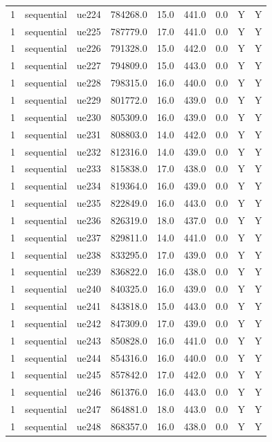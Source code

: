\begin{table}[ht]
\begin{tabular}{|c|c|c|c|c|c|c|c|c|}
1 & sequential & ue224 & 784268.0 & 15.0 & 441.0 & 0.0 & Y & Y \\
1 & sequential & ue225 & 787779.0 & 17.0 & 441.0 & 0.0 & Y & Y \\
1 & sequential & ue226 & 791328.0 & 15.0 & 442.0 & 0.0 & Y & Y \\
1 & sequential & ue227 & 794809.0 & 15.0 & 443.0 & 0.0 & Y & Y \\
1 & sequential & ue228 & 798315.0 & 16.0 & 440.0 & 0.0 & Y & Y \\
1 & sequential & ue229 & 801772.0 & 16.0 & 439.0 & 0.0 & Y & Y \\
1 & sequential & ue230 & 805309.0 & 16.0 & 439.0 & 0.0 & Y & Y \\
1 & sequential & ue231 & 808803.0 & 14.0 & 442.0 & 0.0 & Y & Y \\
1 & sequential & ue232 & 812316.0 & 14.0 & 439.0 & 0.0 & Y & Y \\
1 & sequential & ue233 & 815838.0 & 17.0 & 438.0 & 0.0 & Y & Y \\
1 & sequential & ue234 & 819364.0 & 16.0 & 439.0 & 0.0 & Y & Y \\
1 & sequential & ue235 & 822849.0 & 16.0 & 443.0 & 0.0 & Y & Y \\
1 & sequential & ue236 & 826319.0 & 18.0 & 437.0 & 0.0 & Y & Y \\
1 & sequential & ue237 & 829811.0 & 14.0 & 441.0 & 0.0 & Y & Y \\
1 & sequential & ue238 & 833295.0 & 17.0 & 439.0 & 0.0 & Y & Y \\
1 & sequential & ue239 & 836822.0 & 16.0 & 438.0 & 0.0 & Y & Y \\
1 & sequential & ue240 & 840325.0 & 16.0 & 439.0 & 0.0 & Y & Y \\
1 & sequential & ue241 & 843818.0 & 15.0 & 443.0 & 0.0 & Y & Y \\
1 & sequential & ue242 & 847309.0 & 17.0 & 439.0 & 0.0 & Y & Y \\
1 & sequential & ue243 & 850828.0 & 16.0 & 441.0 & 0.0 & Y & Y \\
1 & sequential & ue244 & 854316.0 & 16.0 & 440.0 & 0.0 & Y & Y \\
1 & sequential & ue245 & 857842.0 & 17.0 & 442.0 & 0.0 & Y & Y \\
1 & sequential & ue246 & 861376.0 & 16.0 & 443.0 & 0.0 & Y & Y \\
1 & sequential & ue247 & 864881.0 & 18.0 & 443.0 & 0.0 & Y & Y \\
1 & sequential & ue248 & 868357.0 & 16.0 & 438.0 & 0.0 & Y & Y \\

\end{tabular}
\end{table}
